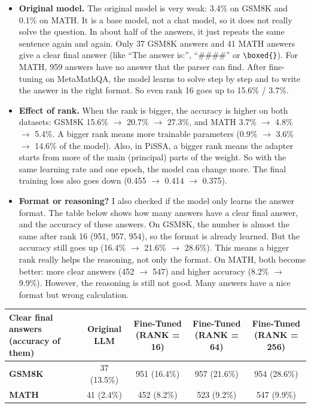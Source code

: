 \documentclass[10pt,a4paper]{article}
\begin{document}
\begin{itemize}
  \item \textbf{Original model.} The original model is very weak: 3.4\% on GSM8K and 0.1\% on MATH. It is a base
  model, not a chat model, so it does not really solve the question. In about half of the answers, it just repeats
  the same sentence again and again. Only 37 GSM8K answers and 41 MATH answers give a clear final answer (like ``The answer is:'',
  ``\#\#\#\#'' or \verb|\boxed{}|). For MATH, 959 answers have no answer that the parser can find. After
  fine-tuning on MetaMathQA, the model learns to solve step by step and to write the answer in the right format.
  So even rank 16 goes up to 15.6\% / 3.7\%.
  \item \textbf{Effect of rank.} When the rank is bigger, the accuracy is higher on both datasets: GSM8K
  15.6\% $\to$ 20.7\% $\to$ 27.3\%, and MATH 3.7\% $\to$ 4.8\% $\to$ 5.4\%. A bigger rank means more trainable
  parameters (0.9\% $\to$ 3.6\% $\to$ 14.6\% of the model). Also, in PiSSA, a bigger rank means the adapter starts
  from more of the main (principal) parts of the weight. So with the same learning rate and one epoch, the model
  can change more. The final training loss also goes down (0.455 $\to$ 0.414 $\to$ 0.375).
  \item \textbf{Format or reasoning?} I also checked if the model only learns the answer format. The table below
  shows how many answers have a clear final answer, and the accuracy of these answers. On GSM8K, the number is
  almost the same after rank 16 (951, 957, 954), so the format is already learned. But the accuracy still goes up
  (16.4\% $\to$ 21.6\% $\to$ 28.6\%). This means a bigger rank really helps the reasoning, not only the format. On
  MATH, both become better: more clear answers (452 $\to$ 547) and higher accuracy (8.2\% $\to$ 9.9\%). However,
  the reasoning is still not good. Many answers have a nice format but wrong calculation.
\end{itemize}

\begin{center}\small
\begin{tabularx}{\textwidth}{>{\raggedright\arraybackslash}p{3.6cm} C C C C}
  \toprule
  \textbf{Clear final answers (accuracy of them)} & \textbf{Original LLM} & \textbf{Fine-Tuned (RANK = 16)} & \textbf{Fine-Tuned (RANK = 64)} & \textbf{Fine-Tuned (RANK = 256)} \\
  \midrule
  \textbf{GSM8K} & 37 (13.5\%) & 951 (16.4\%) & 957 (21.6\%) & 954 (28.6\%) \\
  \textbf{MATH}  & 41 (2.4\%)  & 452 (8.2\%)  & 523 (9.2\%)  & 547 (9.9\%)  \\
  \bottomrule
\end{tabularx}
\end{center}
\end{document}
